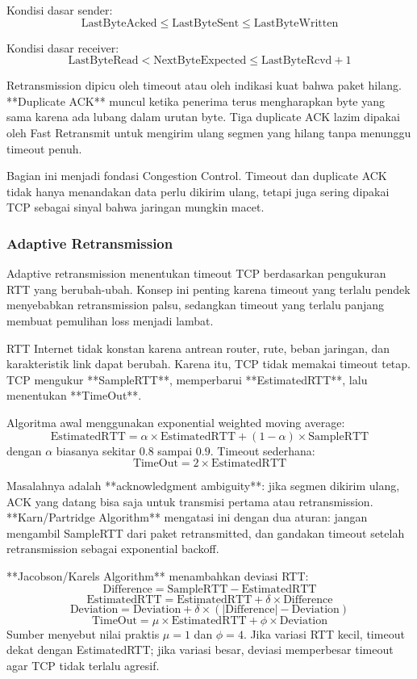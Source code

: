Kondisi dasar sender:
\[
    \text{LastByteAcked} \leq \text{LastByteSent} \leq \text{LastByteWritten}
\]

Kondisi dasar receiver:
\[
    \text{LastByteRead} < \text{NextByteExpected} \leq \text{LastByteRcvd}+1
\]

Retransmission dipicu oleh timeout atau oleh indikasi kuat bahwa paket hilang. **Duplicate ACK** muncul ketika penerima terus mengharapkan byte yang sama karena ada lubang dalam urutan byte. Tiga duplicate ACK lazim dipakai oleh Fast Retransmit untuk mengirim ulang segmen yang hilang tanpa menunggu timeout penuh.

Bagian ini menjadi fondasi Congestion Control. Timeout dan duplicate ACK tidak hanya menandakan data perlu dikirim ulang, tetapi juga sering dipakai TCP sebagai sinyal bahwa jaringan mungkin macet.

\subsubsection{Adaptive Retransmission}
\begin{jawab}
Adaptive retransmission menentukan timeout TCP berdasarkan pengukuran RTT yang berubah-ubah. Konsep ini penting karena timeout yang terlalu pendek menyebabkan retransmission palsu, sedangkan timeout yang terlalu panjang membuat pemulihan loss menjadi lambat.
\end{jawab}

RTT Internet tidak konstan karena antrean router, rute, beban jaringan, dan karakteristik link dapat berubah. Karena itu, TCP tidak memakai timeout tetap. TCP mengukur **SampleRTT**, memperbarui **EstimatedRTT**, lalu menentukan **TimeOut**.

Algoritma awal menggunakan exponential weighted moving average:
\[
    \text{EstimatedRTT} =
    \alpha \times \text{EstimatedRTT} + (1-\alpha) \times \text{SampleRTT}
\]
dengan $\alpha$ biasanya sekitar $0.8$ sampai $0.9$. Timeout sederhana:
\[
    \text{TimeOut} = 2 \times \text{EstimatedRTT}
\]

Masalahnya adalah **acknowledgment ambiguity**: jika segmen dikirim ulang, ACK yang datang bisa saja untuk transmisi pertama atau retransmission. **Karn/Partridge Algorithm** mengatasi ini dengan dua aturan: jangan mengambil SampleRTT dari paket retransmitted, dan gandakan timeout setelah retransmission sebagai exponential backoff.

**Jacobson/Karels Algorithm** menambahkan deviasi RTT:
\[
    \text{Difference} = \text{SampleRTT} - \text{EstimatedRTT}
\]
\[
    \text{EstimatedRTT} = \text{EstimatedRTT} + \delta \times \text{Difference}
\]
\[
    \text{Deviation} = \text{Deviation} + \delta \times (|\text{Difference}|-\text{Deviation})
\]
\[
    \text{TimeOut} = \mu \times \text{EstimatedRTT} + \phi \times \text{Deviation}
\]
Sumber menyebut nilai praktis $\mu=1$ dan $\phi=4$. Jika variasi RTT kecil, timeout dekat dengan EstimatedRTT; jika variasi besar, deviasi memperbesar timeout agar TCP tidak terlalu agresif.

